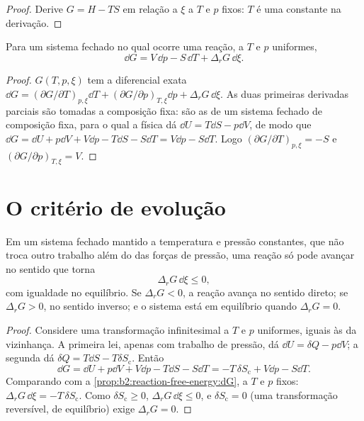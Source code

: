 \begin{proof}
Derive $G = H - TS$ em relação a $\xi$ a $T$ e $p$ fixos: $T$
é uma constante na derivação.
\end{proof}

\begin{proposition}\label{prop:b2:reaction-free-energy:dG}
Para um sistema fechado no qual ocorre uma reação, a $T$ e
$p$ uniformes,
\[
  \dd G = V\,\dd p - S\,\dd T + \Delta_r G\,\dd\xi .
\]
\end{proposition}

\begin{proof}
$G(T, p, \xi)$ tem a diferencial exata $\dd G = (\partial G/\partial
T)_{p,\xi}\dd T + (\partial G/\partial p)_{T,\xi}\dd p + \Delta_r G\,\dd\xi$.
As duas primeiras derivadas parciais são tomadas a composição fixa: são
as de um sistema fechado de composição fixa, para o qual a física dá
$\dd U = T\dd S - p\dd V$, de modo que $\dd G = \dd U + p\dd V + V\dd p - T\dd S
- S\dd T = V\dd p - S\dd T$. Logo $(\partial G/\partial T)_{p,\xi} = -S$
e $(\partial G/\partial p)_{T,\xi} = V$.
\end{proof}

\section{O critério de evolução}

\begin{theorem}\label{thm:b2:reaction-free-energy:evolution}
Em um sistema fechado mantido a temperatura e pressão constantes, que não
troca outro trabalho além do das forças de pressão, uma reação só pode
avançar no sentido que torna
\[
  \Delta_r G\,\dd\xi \leq 0 ,
\]
com igualdade no equilíbrio. Se $\Delta_r G < 0$, a reação avança no
sentido direto; se $\Delta_r G > 0$, no sentido inverso; e o sistema está em
equilíbrio quando $\Delta_r G = 0$.
\end{theorem}

\begin{proof}
Considere uma transformação infinitesimal a $T$ e $p$ uniformes, iguais às da
vizinhança. A primeira lei, apenas com trabalho de pressão, dá $\dd U = \delta Q
- p\dd V$; a segunda dá $\delta Q = T\dd S - T\delta S_{\text{c}}$. Então
\[
  \dd G = \dd U + p\dd V + V\dd p - T\dd S - S\dd T = -T\,\delta
  S_{\text{c}} + V\dd p - S\dd T .
\]
Comparando com a \cref{prop:b2:reaction-free-energy:dG}, a $T$ e $p$ fixos:
$\Delta_r G\,\dd\xi = -T\,\delta S_{\text{c}}$. Como $\delta S_{\text{c}}
\geq 0$, $\Delta_r G\,\dd\xi \leq 0$, e $\delta S_{\text{c}} = 0$ (uma
transformação reversível, de equilíbrio) exige $\Delta_r G = 0$.
\end{proof}


